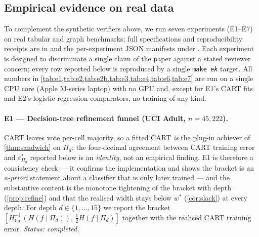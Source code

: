 \documentclass[10pt]{article}
\theoremstyle{definition}
\theoremstyle{remark}
\newcommand{\Hinv}{H_{\mathrm{bin}}^{-1}}
\newcommand{\eps}{\varepsilon}
\begin{document}
\subsection{Empirical evidence on real data}\label{sec:apps:empirical}

To complement the synthetic verifiers above, we run seven
experiments (E1--E7) on real tabular and graph benchmarks; full
specifications and reproducibility receipts are in
 and the per-experiment JSON
manifests under . Each experiment is
designed to discriminate a single claim of the paper against a
stated reviewer concern; every row reported below is reproduced
by a single \texttt{make e\textit{k}} target. All numbers in
\cref{tab:e1,tab:e2,tab:e2b,tab:e3,tab:e4,tab:e6,tab:e7} are
run on a single CPU core (Apple M-series laptop) with no GPU
and, except for E1's CART fits and E2's logistic-regression
comparators, no training of any kind.

\paragraph{E1 --- Decision-tree refinement funnel (UCI Adult,
$n=45{,}222$).} CART leaves vote per-cell majority, so a fitted
CART \emph{is} the plug-in achiever of \cref{thm:sandwich} on
$\Pi_{d}$: the four-decimal agreement between CART training
error and $\eps^{*}_{\Pi_{d}}$ reported below is an
\emph{identity}, not an empirical finding. E1 is therefore a
consistency check --- it confirms the implementation and shows
the bracket is an \emph{a-priori} statement about a classifier
that is only later trained --- and the substantive content is the
monotone tightening of the bracket with depth
(\cref{prop:refine}) and that the realised width stays below
$w^{*}$ (\cref{cor:slack}) at every depth.
For depth $d \in \{1, \ldots, 15\}$ we report the bracket
$[\Hinv(H(f\mid\Pi_d)),\, \tfrac{1}{2}H(f\mid\Pi_d)]$ together
with the realised CART training error. \emph{Status: completed.}
\end{document}
